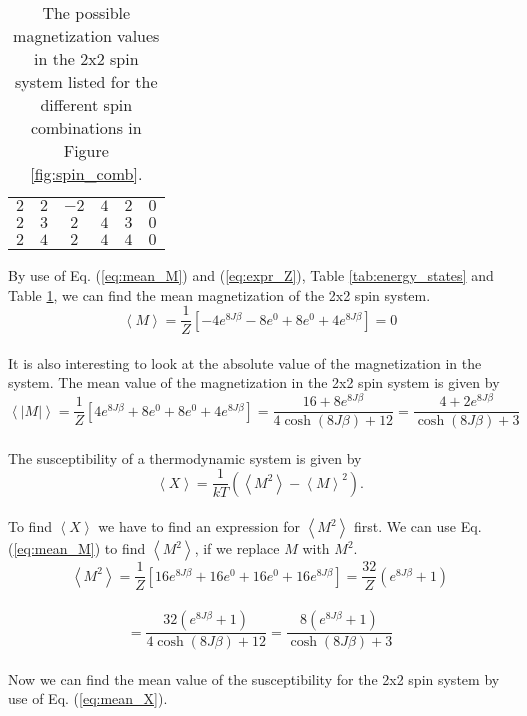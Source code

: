 \documentclass[12pt]{article}
\begin{document}
\begin{flushleft}
\begin{table}[!h]
\begin{center}
\begin{tabular}{| c | c | c || c | c | c |}
	$2$ & $2$ & $-2$ & $4$ & $2$ & $0$\\
	$2$ & $3$ & $2$ & $4$ & $3$ & $0$\\
	$2$ & $4$ & $2$ & $4$ & $4$ & $0$\\
  \hline
\end{tabular}
\end{center}
\caption{\label{tab:mag_states}The possible magnetization values in the 2x2 spin system listed for the different spin combinations in Figure \ref{fig:spin_comb}.}
\end{table}
\newpage
By use of Eq. (\ref{eq:mean_M}) and (\ref{eq:expr_Z}), Table \ref{tab:energy_states} and Table \ref{tab:mag_states}, we can find the mean magnetization of the 2x2 spin system.
\vspace{5mm}
$$\left<M\right> = \frac{1}{Z}\left[-4e^{8J\beta} - 8e^{0} + 8e^{0} + 4e^{8J\beta}\right] = 0$$\\
\vspace{5mm}
It is also interesting to look at the absolute value of the magnetization in the system. The mean value of the magnetization in the 2x2 spin system is given by
\vspace{5mm}
$$\left<|M|\right> = \frac{1}{Z}\left[4e^{8J\beta} + 8e^{0} + 8e^{0} + 4e^{8J\beta}\right] = \frac{16 + 8e^{8J\beta}}{4\cosh(8J\beta) + 12} = \frac{4 + 2e^{8J\beta}}{\cosh(8J\beta) + 3}$$\\
\vspace{5mm}
The susceptibility of a thermodynamic system is given by
\vspace{5mm}
\begin{equation}\label{eq:mean_X}
\left<X\right> = \frac{1}{kT}\left(\left<M^2\right> - \left< M \right>^2\right).
\end{equation}\\
To find $\left<X\right>$ we have to find an expression for $\left<M^2\right>$ first. We can use Eq. (\ref{eq:mean_M}) to find $\left<M^2\right>$, if we replace $M$ with $M^2$. 
\vspace{5mm}
$$\left<M^2\right> = \frac{1}{Z}\left[16e^{8J\beta} + 16e^{0} + 16e^{0} + 16e^{8J\beta}\right] = \frac{32}{Z}\left(e^{8J\beta} + 1\right)$$\\
\vspace{5mm}
$$ = \frac{32\left(e^{8J\beta} + 1\right)}{4\cosh(8J\beta) + 12} = \frac{8\left(e^{8J\beta} + 1\right)}{\cosh(8J\beta) + 3}$$\\
\vspace{5mm}
Now we can find the mean value of the susceptibility for the 2x2 spin system by use of Eq. (\ref{eq:mean_X}).

\end{flushleft}
\end{document}
